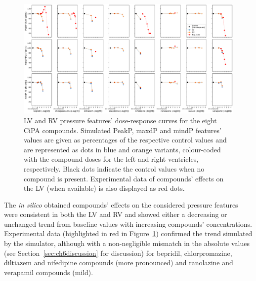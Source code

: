 \begin{figure}[ht!]
    \myfloatalign
    \includegraphics[width=\textwidth]{figures/chapter06/simulated_cipa_compounds_effects_on_lv_rv_pressure_features_with_expdata.pdf}
    \caption{LV and RV pressure features' dose-response curves for the eight CiPA compounds. Simulated PeakP, maxdP and mindP features' values are given as percentages of the respective control values and are represented as dots in blue and orange variants, colour-coded with the compound doses for the left and right ventricles, respectively. Black dots indicate the control values when no compound is present. Experimental data of compounds' effects on the LV (when available) is also displayed as red dots.}
    \label{fig:LVRVfeatsalldrugsrespcurves}
\end{figure}

\vspace{0.2cm}
The \textit{in silico} obtained compounds' effects on the considered pressure features were consistent in both the LV and RV and showed either a decreasing or unchanged trend from baseline values with increasing compounds' concentrations. Experimental data (highlighted in red in Figure~\ref{fig:LVRVfeatsalldrugsrespcurves}) confirmed the trend simulated by the simulator, although with a non-negligible mismatch in the absolute values (see Section~\ref{sec:ch6discussion} for discussion) for bepridil, chlorpromazine, diltiazem and nifedipine compounds (more pronounced) and ranolazine and verapamil compounds (mild).


%
%
%
